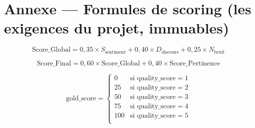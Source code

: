 \documentclass[12pt, a4paper]{article}
\begin{document}
\appendix

\section*{Annexe — Formules de scoring (les exigences du projet, immuables)}

\begin{equation}
  \text{Score\_Global} = 0{,}35 \times S_{\text{sentiment}}
                       + 0{,}40 \times D_{\text{discours}}
                       + 0{,}25 \times N_{\text{bruit}}
\end{equation}

\begin{equation}
  \text{Score\_Final} = 0{,}60 \times \text{Score\_Global}
                      + 0{,}40 \times \text{Score\_Pertinence}
\end{equation}

\begin{equation}
  \text{gold\_score} =
  \begin{cases}
    0   & \text{si quality\_score} = 1 \\
    25  & \text{si quality\_score} = 2 \\
    50  & \text{si quality\_score} = 3 \\
    75  & \text{si quality\_score} = 4 \\
    100 & \text{si quality\_score} = 5 \\
  \end{cases}
\end{equation}
\end{document}
